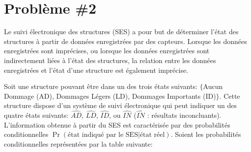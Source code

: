 \documentclass[letterpaper]{article}
\begin{document}
%
%

\section*{Problème \#2}
Le suivi électronique des structures (SES) a pour but de déterminer l'état des structures à partir de données enregistrées par des capteurs. Lorsque les données enregistrées sont imprécises, ou lorsque les données enregistrées sont indirectement liées à l'état des structures, la relation entre les données enregistrées et l'état d'une structure est également imprécise.

Soit une structure pouvant \^etre dans un des trois états suivants: $\{$Aucun Dommage (AD), Dommages Légers (LD), Dommages Importants (ID)$\}$. Cette structure dispose d'un système de suivi électronique qui peut indiquer un des quatre états suivants: $\widehat{\mathit{AD}}$, $\widehat{\mathit{LD}}$, $\widehat{\mathit{ID}}$, ou $\widehat{\mathit{IN}}$ ($\widehat{\mathit{IN}}$ : résultats inconcluants). L'information obtenue à partir du SES est caractérisée par des probabilités conditionnelles $\Pr(\text{état indiqué par le SES}|\text{état réel})$. Soient les probabilités conditionnelles représentées par la table suivante:
\end{document}
